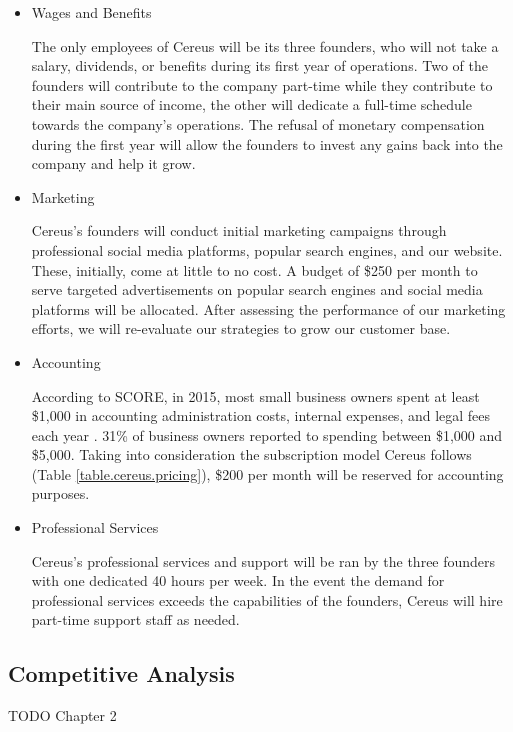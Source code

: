 \begin{itemize}

\item Wages and Benefits

The only employees of Cereus will be its three founders, who will not take a salary, dividends, or benefits during its first year of operations. Two of the founders will contribute to the company part-time while they contribute to their main source of income, the other will dedicate a full-time schedule towards the company's operations. The refusal of monetary compensation during the first year will allow the founders to invest any gains back into the company and help it grow.

\item Marketing

Cereus's founders will conduct initial marketing campaigns through professional social media platforms, popular search engines, and our website. These, initially, come at little to no cost. A budget of \$250 per month to serve targeted advertisements on popular search engines and social media platforms will be allocated. After assessing the performance of our marketing efforts, we will re-evaluate our strategies to grow our customer base.

\item Accounting

According to SCORE, in 2015, most small business owners spent at least \$1,000 in accounting administration costs, internal expenses, and legal fees each year \cite{score.2016}. 31\% of business owners reported to spending between \$1,000 and \$5,000. Taking into consideration the subscription model Cereus follows (Table \ref{table.cereus.pricing}), \$200 per month will be reserved for accounting purposes.

\item Professional Services

Cereus's professional services and support will be ran by the three founders with one dedicated 40 hours per week. In the event the demand for professional services exceeds the capabilities of the founders, Cereus will hire part-time support staff as needed.

\end{itemize}

\subsection{Competitive Analysis}

TODO Chapter 2

